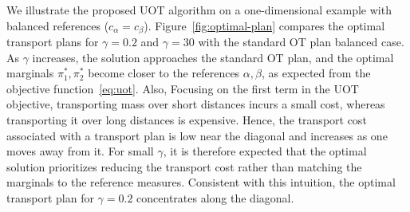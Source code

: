 \documentclass{ifacconf}
\begin{document}
We illustrate the proposed UOT algorithm on a one-dimensional example with balanced references ($c_\alpha=c_\beta$). Figure~\ref{fig:optimal-plan} compares the optimal transport plans for $\gamma=0.2$ and $\gamma=30$ with the standard OT plan balanced case. As $\gamma$ increases, the solution approaches the
standard OT plan, and the optimal marginals $\pi_1^\ast,\pi_2^\ast$ become closer to the references
$\alpha,\beta$, as expected from the objective function~\eqref{eq:uot}. Also, Focusing on the first term in the UOT objective, transporting mass over short distances incurs a small cost, whereas transporting it over long distances is expensive. Hence, the transport cost associated with a transport plan is low near the diagonal and increases as one moves away from it. For small $\gamma$, it is therefore expected that the optimal solution prioritizes reducing the transport cost rather than matching the marginals to the reference measures. Consistent with this intuition, the optimal transport plan for $\gamma=0.2$ concentrates along the diagonal.








\end{document}
